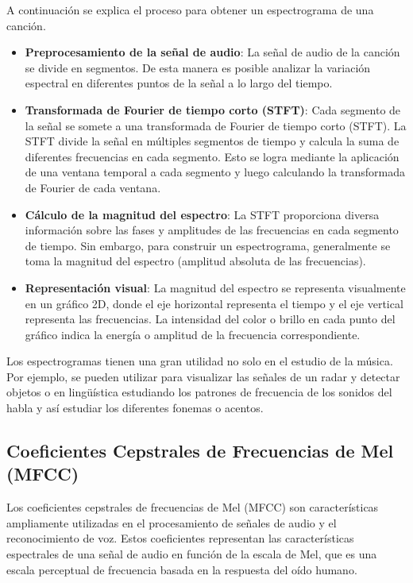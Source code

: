 A continuación se explica el proceso para obtener un espectrograma de una canción.

\begin{itemize}
\tightlist
\item \textbf{Preprocesamiento de la señal de audio}: La señal de audio de la canción se divide en segmentos. De esta manera es posible analizar la variación espectral en diferentes puntos de la señal a lo largo del tiempo.

\item \textbf{Transformada de Fourier de tiempo corto (STFT)}: Cada segmento de la señal se somete a una transformada de Fourier de tiempo corto (STFT). La STFT divide la señal en múltiples segmentos de tiempo y calcula la suma de diferentes frecuencias en cada segmento. 
Esto se logra mediante la aplicación de una ventana temporal a cada segmento y luego calculando la transformada de Fourier de cada ventana.

\item \textbf{Cálculo de la magnitud del espectro}: La STFT proporciona diversa información sobre las fases y amplitudes de las frecuencias en cada segmento de tiempo. Sin embargo, para construir un espectrograma, generalmente se toma la magnitud del espectro (amplitud absoluta de las frecuencias).

\item \textbf{Representación visual}: La magnitud del espectro se representa visualmente en un gráfico 2D, donde el eje horizontal representa el tiempo y el eje vertical representa las frecuencias. La intensidad del color o brillo en cada punto del gráfico indica la energía o amplitud de la frecuencia correspondiente.
\end{itemize}

Los espectrogramas tienen una gran utilidad no solo en el estudio de la música. Por ejemplo, se pueden utilizar para visualizar las señales de un radar y detectar objetos o en lingüística estudiando los patrones de frecuencia de los sonidos del habla y así estudiar los diferentes fonemas o acentos.


\newpage

\subsection{Coeﬁcientes Cepstrales de Frecuencias de Mel (MFCC)}
Los coeficientes cepstrales de frecuencias de Mel (MFCC) son características ampliamente utilizadas en el procesamiento de señales de audio y el reconocimiento de voz. 
Estos coeficientes representan las características espectrales de una señal de audio en función de la escala de Mel, que es una escala perceptual de frecuencia basada en la respuesta del oído humano.

